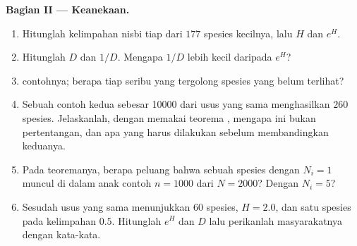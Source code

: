 \begin{problem}
\medskip
\noindent\textbf{Bagian II --- Keanekaan.}
\begin{enumerate}[resume]
  \item Hitunglah kelimpahan nisbi tiap dari $177$ spesies
        kecilnya, lalu  $H$ dan $e^{H}$.
  \item Hitunglah  $D$ dan $1/D$. Mengapa $1/D$ lebih kecil
        daripada $e^{H}$?
  \item {} contohnya; berapa  tiap seribu yang tergolong
        spesies yang belum terlihat?
  \item Sebuah contoh kedua sebesar \num{10000}  dari usus yang sama
        menghasilkan $260$ spesies. Jelaskanlah, dengan memakai teorema
        , mengapa ini bukan pertentangan, dan apa yang harus
        dilakukan sebelum membandingkan keduanya.
  \item Pada teoremanya, berapa peluang bahwa sebuah spesies dengan
        $N_{i} = 1$ muncul di dalam anak contoh $n = 1000$ dari $N =
        2000$? Dengan $N_{i} = 5$?
  \item Sesudah  usus yang sama menunjukkan $60$ spesies, $H = 2.0$,
        dan satu spesies pada kelimpahan $0.5$. Hitunglah $e^{H}$ dan $D$ lalu
        perikanlah masyarakatnya dengan kata-kata.
\end{enumerate}


\end{problem}
